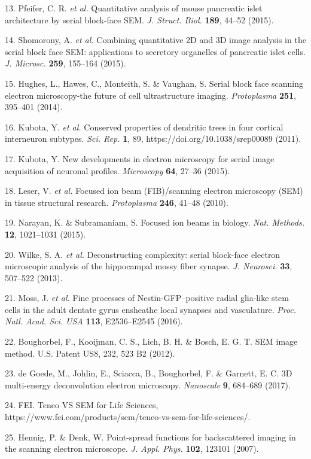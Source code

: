 \documentclass{article}
\newenvironment{reflist}{\par\small\setlength{\parindent}{0pt}\everypar{\hangindent=2.2em\hangafter=1}}{\par}
\begin{document}
\begin{reflist}
13. Pfeifer, C. R. \emph{et al.} Quantitative analysis of mouse pancreatic islet architecture by serial block-face SEM. \emph{J. Struct. Biol.} \textbf{189}, 44–52 (2015).

14. Shomorony, A. \emph{et al.} Combining quantitative 2D and 3D image analysis in the serial block face SEM: applications to secretory organelles of pancreatic islet cells. \emph{J. Microsc.} \textbf{259}, 155–164 (2015).

15. Hughes, L., Hawes, C., Monteith, S. \& Vaughan, S. Serial block face scanning electron microscopy-the future of cell ultrastructure imaging. \emph{Protoplasma} \textbf{251}, 395–401 (2014).

16. Kubota, Y. \emph{et al.} Conserved properties of dendritic trees in four cortical interneuron subtypes. \emph{Sci. Rep.} \textbf{1}, 89, https://doi.org/10.1038/srep00089 (2011).

17. Kubota, Y. New developments in electron microscopy for serial image acquisition of neuronal profiles. \emph{Microscopy} \textbf{64}, 27–36 (2015).

18. Leser, V. \emph{et al.} Focused ion beam (FIB)/scanning electron microscopy (SEM) in tissue structural research. \emph{Protoplasma} \textbf{246}, 41–48 (2010).

19. Narayan, K. \& Subramaniam, S. Focused ion beams in biology. \emph{Nat. Methods.} \textbf{12}, 1021–1031 (2015).

20. Wilke, S. A. \emph{et al.} Deconstructing complexity: serial block-face electron microscopic analysis of the hippocampal mossy fiber synapse. \emph{J. Neurosci.} \textbf{33}, 507–522 (2013).

21. Moss, J. \emph{et al.} Fine processes of Nestin-GFP–positive radial glia-like stem cells in the adult dentate gyrus ensheathe local synapses and vasculature. \emph{Proc. Natl. Acad. Sci. USA} \textbf{113}, E2536–E2545 (2016).

22. Boughorbel, F., Kooijman, C. S., Lich, B. H. \& Bosch, E. G. T. SEM image method. U.S. Patent US8, 232, 523 B2 (2012).

23. de Goede, M., Johlin, E., Sciacca, B., Boughorbel, F. \& Garnett, E. C. 3D multi-energy deconvolution electron microscopy. \emph{Nanoscale} \textbf{9}, 684–689 (2017).

24. FEI. Teneo VS SEM for Life Sciences, https://www.fei.com/products/sem/teneo-vs-sem-for-life-sciences/.

25. Hennig, P. \& Denk, W. Point-spread functions for backscattered imaging in the scanning electron microscope. \emph{J. Appl. Phys.} \textbf{102}, 123101 (2007).


\end{reflist}
\end{document}
